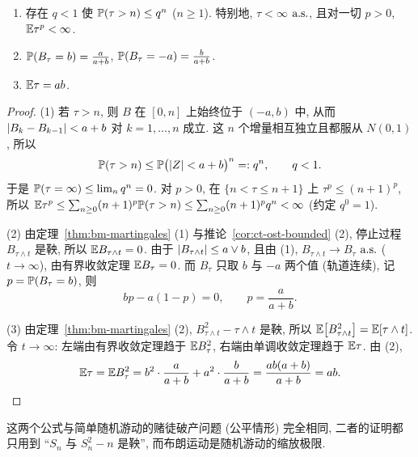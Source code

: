 \begin{theorem}[双边出口]\label{thm:exit}
\begin{enumerate}
\item 存在 $q<1$ 使 $\P(\tau>n)\le q^n$ ($n\ge1$). 特别地, $\tau<\infty$ $\as$, 且对一切 $p>0$, $\E\tau^p<\infty$.
\item $\P(B_\tau=b)=\frac{a}{a+b}$, $\P(B_\tau=-a)=\frac{b}{a+b}$.
\item $\E\tau=ab$.
\end{enumerate}
\end{theorem}

\begin{proof}
(1) 若 $\tau>n$, 则 $B$ 在 $[0,n]$ 上始终位于 $(-a,b)$ 中, 从而 $\abs{B_k-B_{k-1}}<a+b$ 对 $k=1,\dots,n$ 成立. 这 $n$ 个增量相互独立且都服从 $N(0,1)$, 所以
\[
\P(\tau>n)\le\P\big(\abs{Z}<a+b\big)^n=:q^n,\qquad q<1.
\]
于是 $\P(\tau=\infty)\le\lim_nq^n=0$. 对 $p>0$, 在 $\{n<\tau\le n+1\}$ 上 $\tau^p\le(n+1)^p$, 所以 $\E\tau^p\le\sum_{n\ge0}(n+1)^p\P(\tau>n)\le\sum_{n\ge0}(n+1)^pq^n<\infty$ (约定 $q^0=1$).

(2) 由定理~\ref{thm:bm-martingales} (1) 与推论~\ref{cor:ct-ost-bounded} (2), 停止过程 $B_{\tau\wedge t}$ 是鞅, 所以 $\E B_{\tau\wedge t}=0$. 由于 $\abs{B_{\tau\wedge t}}\le a\vee b$, 且由 (1), $B_{\tau\wedge t}\to B_\tau$ $\as$ ($t\to\infty$), 由有界收敛定理 $\E B_\tau=0$. 而 $B_\tau$ 只取 $b$ 与 $-a$ 两个值 (轨道连续), 记 $p=\P(B_\tau=b)$, 则
\[
bp-a(1-p)=0,\qquad p=\frac{a}{a+b}.
\]

(3) 由定理~\ref{thm:bm-martingales} (2), $B^2_{\tau\wedge t}-\tau\wedge t$ 是鞅, 所以 $\E\big[B^2_{\tau\wedge t}\big]=\E[\tau\wedge t]$. 令 $t\to\infty$: 左端由有界收敛定理趋于 $\E B_\tau^2$, 右端由单调收敛定理趋于 $\E\tau$. 由 (2),
\[
\E\tau=\E B_\tau^2=b^2\cdot\frac{a}{a+b}+a^2\cdot\frac{b}{a+b}=\frac{ab(a+b)}{a+b}=ab.\qedhere
\]
\end{proof}

这两个公式与简单随机游动的赌徒破产问题 (公平情形) 完全相同, 二者的证明都只用到 ``$S_n$ 与 $S_n^2-n$ 是鞅'', 而布朗运动是随机游动的缩放极限.

